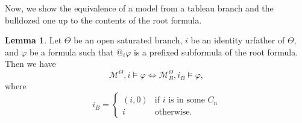 \documentclass{article}
\theoremstyle{definition}
\newtheorem{lemma}[definition]{Lemma}
\newcommand{\Kmodel}{\mathcal{M}}
\begin{document}
Now, we show the equivalence of a model from a tableau branch and the bulldozed one up to the contents of the root formula.

\begin{lemma}
    Let $\Theta$ be an open saturated branch, $i$ be an identity urfather of $\Theta$, and $\varphi$ be a formula such that $@_i \varphi$ is a prefixed subformula of the root formula. Then we have
    \[
        \Kmodel^\Theta, i \models \varphi \iff \Kmodel^\Theta_B, i_B \models \varphi ,
    \]
    where
    \[
        i_B = 
        \begin{cases}
            (i, 0) &\text{if } i \text{ is in some } C_n \\
            i &\text{otherwise}.
        \end{cases}
    \]
    \label{lembulldozingpreserve}
\end{lemma}
\end{document}
